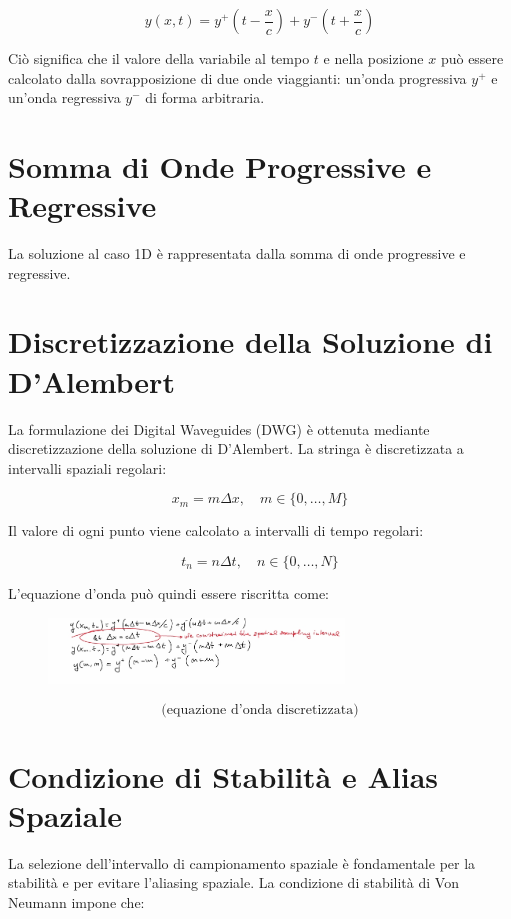 \[
y(x, t) = y^+ \left( t - \frac{x}{c} \right) + y^- \left( t + \frac{x}{c} \right)
\]

Ciò significa che il valore della variabile al tempo \( t \) e nella posizione \( x \) può essere calcolato dalla sovrapposizione di due onde viaggianti: un'onda progressiva \( y^+ \) e un'onda regressiva \( y^- \) di forma arbitraria.

\section{Somma di Onde Progressive e Regressive}

La soluzione al caso 1D è rappresentata dalla somma di onde progressive e regressive.

\section{Discretizzazione della Soluzione di D'Alembert}

La formulazione dei Digital Waveguides (DWG) è ottenuta mediante discretizzazione della soluzione di D'Alembert. La stringa è discretizzata a intervalli spaziali regolari:

\[
x_m = m \Delta x, \quad m \in \{0, \dots, M\}
\]

Il valore di ogni punto viene calcolato a intervalli di tempo regolari:

\[
t_n = n \Delta t, \quad n \in \{0, \dots, N\}
\]

L'equazione d'onda può quindi essere riscritta come:
\begin{figure}[H]
    \centering
    \includegraphics[width=0.7\textwidth]{capitoli/capitolo14/immagini/image1.jpeg}
\end{figure}

\[
\text{(equazione d'onda discretizzata)}
\]

\section{Condizione di Stabilità e Alias Spaziale}

La selezione dell'intervallo di campionamento spaziale è fondamentale per la stabilità e per evitare l'aliasing spaziale. La condizione di stabilità di Von Neumann impone che:

